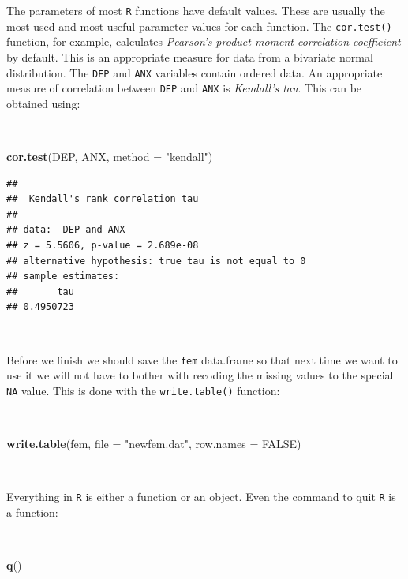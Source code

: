 \documentclass[12pt,a4paper]{book}
\newenvironment{Shaded}{\begin{snugshade}}{\end{snugshade}}
\newcommand{\KeywordTok}[1]{\textcolor[rgb]{0.13,0.29,0.53}{\textbf{#1}}}
\newcommand{\DataTypeTok}[1]{\textcolor[rgb]{0.13,0.29,0.53}{#1}}
\newcommand{\StringTok}[1]{\textcolor[rgb]{0.31,0.60,0.02}{#1}}
\newcommand{\OtherTok}[1]{\textcolor[rgb]{0.56,0.35,0.01}{#1}}
\newcommand{\NormalTok}[1]{#1}
\theoremstyle{definition}
\theoremstyle{definition}
\theoremstyle{definition}
\theoremstyle{remark}
\begin{document}
The parameters of most \texttt{R} functions have default values. These
are usually the most used and most useful parameter values for each
function. The \texttt{cor.test()} function, for example, calculates
\emph{Pearson's product moment correlation coefficient} by default. This
is an appropriate measure for data from a bivariate normal distribution.
The \texttt{DEP} and \texttt{ANX} variables contain ordered data. An
appropriate measure of correlation between \texttt{DEP} and \texttt{ANX}
is \emph{Kendall's tau}. This can be obtained using:

~

\begin{Shaded}
\begin{Highlighting}[]
\KeywordTok{cor.test}\NormalTok{(DEP, ANX, }\DataTypeTok{method =} \StringTok{"kendall"}\NormalTok{)}
\end{Highlighting}
\end{Shaded}

\begin{verbatim}
## 
##  Kendall's rank correlation tau
## 
## data:  DEP and ANX
## z = 5.5606, p-value = 2.689e-08
## alternative hypothesis: true tau is not equal to 0
## sample estimates:
##       tau 
## 0.4950723
\end{verbatim}

~

Before we finish we should save the \texttt{fem} data.frame so that next
time we want to use it we will not have to bother with recoding the
missing values to the special \texttt{NA} value. This is done with the
\texttt{write.table()} function:

~

\begin{Shaded}
\begin{Highlighting}[]
\KeywordTok{write.table}\NormalTok{(fem, }\DataTypeTok{file =} \StringTok{"newfem.dat"}\NormalTok{, }\DataTypeTok{row.names =} \OtherTok{FALSE}\NormalTok{)}
\end{Highlighting}
\end{Shaded}

~

Everything in \texttt{R} is either a function or an object. Even the
command to quit \texttt{R} is a function:

~

\begin{Shaded}
\begin{Highlighting}[]
\KeywordTok{q}\NormalTok{()}
\end{Highlighting}
\end{Shaded}
\end{document}
